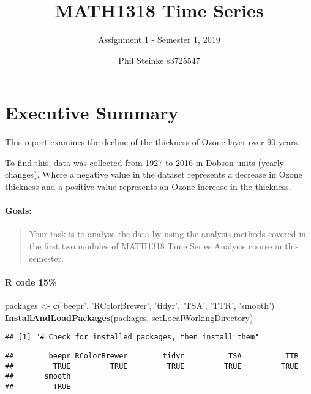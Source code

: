 \documentclass[]{article}
\title{MATH1318 Time Series}
\subtitle{Assignment 1 - Semester 1, 2019}
\author{Phil Steinke s3725547}
\date{}
\newenvironment{Shaded}{\begin{snugshade}}{\end{snugshade}}
\newcommand{\KeywordTok}[1]{\textcolor[rgb]{0.13,0.29,0.53}{\textbf{#1}}}
\newcommand{\NormalTok}[1]{#1}
\newcommand{\StringTok}[1]{\textcolor[rgb]{0.31,0.60,0.02}{#1}}
\let\oldparagraph\paragraph
\renewcommand{\paragraph}[1]{\oldparagraph{#1}\mbox{}}
\begin{document}
\maketitle

\hypertarget{executive-summary}{%
\section{Executive Summary}\label{executive-summary}}

This report examines the decline of the thickness of Ozone layer over 90
years.

To find this, data was collected from 1927 to 2016 in Dobson units
(yearly changes). Where a negative value in the dataset represents a
decrease in Ozone thickness and a positive value represents an Ozone
increase in the thickness.

\hypertarget{goals}{%
\paragraph{Goals:}\label{goals}}

\begin{quote}
Your task is to analyse the data by using the analysis methods covered
in the first two modules of MATH1318 Time Series Analysis course in this
semester.
\end{quote}

\hypertarget{r-code-15}{%
\paragraph{R code 15\%}\label{r-code-15}}

\begin{Shaded}
\begin{Highlighting}[]
\NormalTok{packages <-}\StringTok{ }\KeywordTok{c}\NormalTok{(}\StringTok{'beepr'}\NormalTok{, }\StringTok{'RColorBrewer'}\NormalTok{, }\StringTok{'tidyr'}\NormalTok{, }\StringTok{'TSA'}\NormalTok{, }\StringTok{'TTR'}\NormalTok{, }\StringTok{'smooth'}\NormalTok{)}
\KeywordTok{InstallAndLoadPackages}\NormalTok{(packages, setLocalWorkingDirectory)}
\end{Highlighting}
\end{Shaded}

\begin{verbatim}
## [1] "# Check for installed packages, then install them"
\end{verbatim}

\begin{verbatim}
##        beepr RColorBrewer        tidyr          TSA          TTR 
##         TRUE         TRUE         TRUE         TRUE         TRUE 
##       smooth 
##         TRUE
\end{verbatim}
\end{document}
